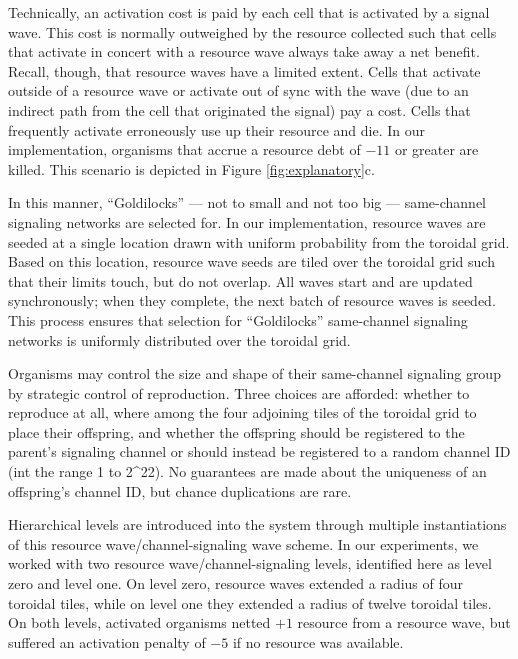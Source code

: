Technically, an activation cost is paid by each cell that is activated by a signal wave.
This cost is normally outweighed by the resource collected such that cells that activate in concert with a resource wave always take away a net benefit.
Recall, though, that resource waves have a limited extent.
Cells that activate outside of a resource wave or activate out of sync with the wave (due to an indirect path from the cell that originated the signal) pay a cost.
Cells that frequently activate erroneously use up their resource and die.
In our implementation, organisms that accrue a resource debt of $-11$ or greater are killed.
This scenario is depicted in Figure \ref{fig:explanatory}c.

In this manner, ``Goldilocks'' --- not to small and not too big --- same-channel signaling networks are selected for.
In our implementation, resource waves are seeded at a single location drawn  with uniform probability from the toroidal grid.
Based on this location, resource wave seeds are tiled over the toroidal grid
such that their limits touch, but do not overlap.
All waves start and are updated synchronously; when they complete,
the next batch of resource waves is seeded.
This process ensures that selection for ``Goldilocks'' same-channel signaling networks is uniformly distributed over the toroidal grid.

Organisms may control the size and shape of their same-channel signaling group by strategic control of reproduction.
Three choices are afforded: whether to reproduce at all, where among the four adjoining tiles of the toroidal grid to place their offspring, and whether the offspring should be registered to the parent's signaling channel or should instead be registered to a random channel ID (int the range 1 to 2^{22}). %
No guarantees are made about the uniqueness of an offspring's channel ID, but chance duplications are rare. %

Hierarchical levels are introduced into the system through multiple instantiations of this resource wave/channel-signaling wave scheme.
In our experiments, we worked with two resource wave/channel-signaling levels, identified here as level zero and level one.
On level zero, resource waves extended a radius of four toroidal tiles, while on level one they extended a radius of twelve toroidal tiles.  On both levels, activated organisms netted $+1$ resource from a resource wave, but suffered an activation penalty of $-5$ if no resource was available.

